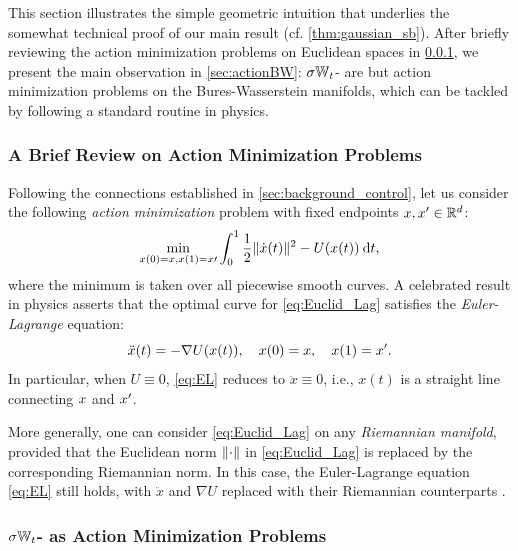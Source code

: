 This section illustrates the simple geometric intuition that underlies the somewhat technical proof of our main result (cf. \cref{thm:gaussian_sb}). After briefly reviewing the action minimization problems on Euclidean spaces in \cref{sec:actionRd}, we present the main observation in \cref{sec:actionBW}: $\sigma\mathbb{W}_{t}$- are but action minimization problems on the Bures-Wasserstein manifolds, which can be tackled by following a standard routine in physics. 

\subsubsection{A Brief Review on Action Minimization Problems} %
\label{sec:actionRd}

Following the connections established in \cref{sec:background_control}, let us consider the following \emph{action minimization} problem with fixed endpoints $x, x' \in \mathbb{R}^d$:
\begin{align}
\label{eq:Euclid_Lag}
\min_{x(0) = x, x(1) = x\prime} \int_0^1 {\frac{1}{2} \lVert\dot{x}(t)\rVert^2 - U(x(t)) } \:\mathrm{d} t,
\end{align}
where the minimum is taken over all piecewise smooth curves. 
A celebrated result in physics asserts that the optimal curve for \eqref{eq:Euclid_Lag} satisfies the \emph{Euler-Lagrange} equation:
\begin{equation}
\label{eq:EL}
\ddot{x}(t) = -\nabla U(x(t)), \quad x(0) = x,\quad x(1) = x'.
\end{equation}
In particular, when $U \equiv0$, \eqref{eq:EL} reduces to $\ddot{x} \equiv 0$, i.e., $x(t)$ is a straight line connecting $x$ and $x'$.

More generally, one can consider \eqref{eq:Euclid_Lag} on any \emph{Riemannian manifold}, provided that the Euclidean norm $\lVert\cdot\rVert$ in \eqref{eq:Euclid_Lag} is replaced by the corresponding Riemannian norm. In this case, the Euler-Lagrange equation \eqref{eq:EL} still holds, with $\ddot{x}$ and $\nabla U$ replaced with their Riemannian counterparts \citep{villani2009optimal}.

\subsubsection{$\sigma\mathbb{W}_{t}$- as Action Minimization Problems}

